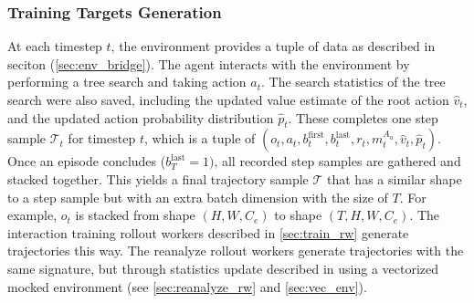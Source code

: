 \documentclass[12pt]{article}
\begin{document}
\subsubsection{Training Targets Generation} \label{sec:targets}
At each timestep $t$, the environment provides a tuple of data as described in seciton (\ref{sec:env_bridge}).
The agent interacts with the environment by performing a tree search and taking action $a_t$.
The search statistics of the tree search were also saved, including the updated value estimate of the root action $\hat{v}_t$,
    and the updated action probability distribution $\hat{p}_t$.
These completes one step sample $\mathcal{T}_t$ for timestep $t$, which is a tuple of $(o_t, a_t, b^{\text{first}}_{t}, b^{\text{last}}_{t}, r_t, m^{A_a}_t, \hat{v}_t, \hat{p}_t)$.
Once an episode concludes ($b^{\text{last}}_{T} = 1)$, all recorded step samples are gathered and stacked together.
This yields a final trajectory sample $\mathcal{T}$ that has a similar shape to a step sample but with an extra batch dimension with the size of $T$.
For example, $o_t$ is stacked from shape $(H, W, C_e)$ to shape $(T, H, W, C_e)$.
The interaction training rollout workers described in \ref{sec:train_rw} generate trajectories this way.
The reanalyze rollout workers generate trajectories with the same signature, but through statistics update described in using a vectorized mocked environment (see \ref{sec:reanalyze_rw} and \ref{sec:vec_env}).
\end{document}
